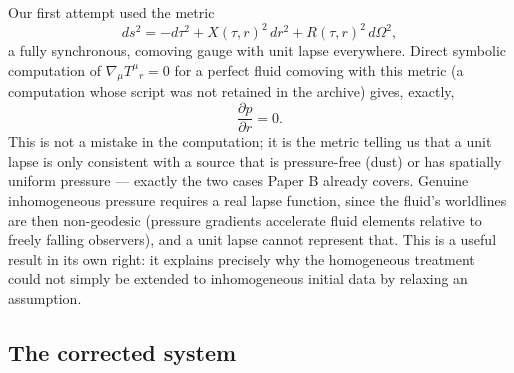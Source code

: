 \documentclass[11pt]{article}
\begin{document}
Our first attempt used the metric
\begin{equation}
ds^2 = -d\tau^2 + X(\tau,r)^2\,dr^2 + R(\tau,r)^2\,d\Omega^2,
\label{eq:bad-gauge}
\end{equation}
a fully synchronous, comoving gauge with unit lapse everywhere. Direct symbolic computation of $\nabla_\mu T^\mu{}_r=0$ for a perfect fluid comoving with this metric (a computation whose script was not retained in the archive) gives, exactly,
\begin{equation}
\frac{\partial p}{\partial r} = 0.
\end{equation}
This is not a mistake in the computation; it is the metric telling us that a unit lapse is only consistent with a source that is pressure-free (dust) or has spatially uniform pressure --- exactly the two cases Paper B already covers. Genuine inhomogeneous pressure requires a real lapse function, since the fluid's worldlines are then non-geodesic (pressure gradients accelerate fluid elements relative to freely falling observers), and a unit lapse cannot represent that. This is a useful result in its own right: it explains precisely why the homogeneous treatment could not simply be extended to inhomogeneous initial data by relaxing an assumption.

\subsection{The corrected system}
\label{sec:corrected-system}
\end{document}
